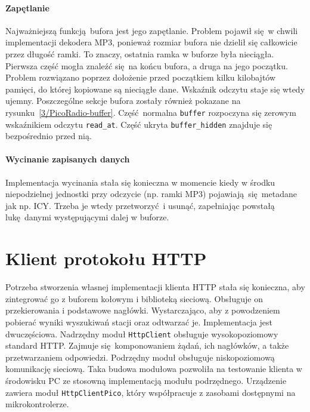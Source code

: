 \documentclass[polish]{aghengthesis}
\begin{document}
		\paragraph{Zapętlanie}
			Najważniejszą funkcją bufora jest jego zapętlanie. Problem pojawił się w chwili implementacji dekodera MP3, ponieważ rozmiar bufora nie dzielił się całkowicie przez długość ramki. To znaczy, ostatnia ramka w buforze była nieciągła. Pierwsza część mogła znaleźć się na końcu bufora, a druga na jego początku. Problem rozwiązano poprzez dołożenie przed początkiem kilku kilobajtów pamięci, do której kopiowane są nieciągłe dane. Wskaźnik odczytu staje się wtedy ujemny. Poszczególne sekcje bufora zostały również pokazane na rysunku~\ref{3/PicoRadio-buffer}. Część normalna \lstinline|buffer| rozpoczyna się zerowym wskaźnikiem odczytu \lstinline|read_at|. Część ukryta \lstinline|buffer_hidden| znajduje się bezpośrednio przed nią.
		
		\paragraph{Wycinanie zapisanych danych}
			Implementacja wycinania stała się konieczna w momencie kiedy w środku niepodzielnej jednostki przy odczycie (np. ramki MP3) pojawiają się metadane jak np. ICY. Trzeba je wtedy przetworzyć i usunąć, zapełniając powstałą lukę danymi występującymi dalej w buforze.
	
	\section{Klient protokołu HTTP}
		Potrzeba stworzenia własnej implementacji klienta HTTP stała się konieczna, aby zintegrować go z buforem kołowym i biblioteką sieciową. Obsługuje on przekierowania i podstawowe nagłówki. Wystarczająco, aby z powodzeniem pobierać wyniki wyszukiwań stacji oraz odtwarzać je. Implementacja jest dwuczęściowa. Nadrzędny moduł \lstinline|HttpClient| obsługuje wysokopoziomowy standard HTTP. Zajmuje się komponowaniem żądań, ich nagłówków, a także przetwarzaniem odpowiedzi. Podrzędny moduł obsługuje niskopoziomową komunikację sieciową. Taka budowa modułowa pozwoliła na testowanie klienta w środowisku PC ze stosowną implementacją modułu podrzędnego. Urządzenie zawiera moduł \lstinline|HttpClientPico|, który współpracuje z zasobami dostępnymi na mikrokontrolerze.
		$ $\\
		
\end{document}
